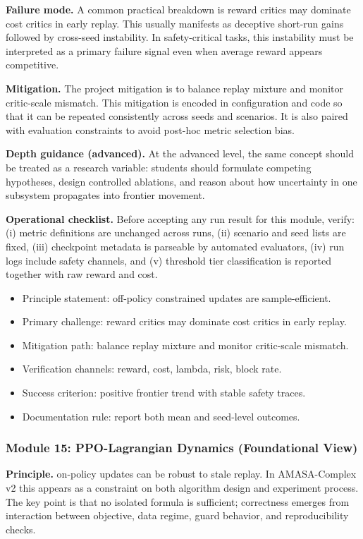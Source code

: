 \documentclass[conference]{IEEEtran}
\begin{document}
\textbf{Failure mode.} A common practical breakdown is reward critics may dominate cost critics in early replay. This usually manifests as deceptive short-run gains followed by cross-seed instability. In safety-critical tasks, this instability must be interpreted as a primary failure signal even when average reward appears competitive.

\textbf{Mitigation.} The project mitigation is to balance replay mixture and monitor critic-scale mismatch. This mitigation is encoded in configuration and code so that it can be repeated consistently across seeds and scenarios. It is also paired with evaluation constraints to avoid post-hoc metric selection bias.

\textbf{Depth guidance (advanced).} At the advanced level, the same concept should be treated as a research variable: students should formulate competing hypotheses, design controlled ablations, and reason about how uncertainty in one subsystem propagates into frontier movement.

\textbf{Operational checklist.} Before accepting any run result for this module, verify: (i) metric definitions are unchanged across runs, (ii) scenario and seed lists are fixed, (iii) checkpoint metadata is parseable by automated evaluators, (iv) run logs include safety channels, and (v) threshold tier classification is reported together with raw reward and cost.

\begin{itemize}[leftmargin=*]
  \item Principle statement: off-policy constrained updates are sample-efficient.
  \item Primary challenge: reward critics may dominate cost critics in early replay.
  \item Mitigation path: balance replay mixture and monitor critic-scale mismatch.
  \item Verification channels: reward, cost, lambda, risk, block rate.
  \item Success criterion: positive frontier trend with stable safety traces.
  \item Documentation rule: report both mean and seed-level outcomes.
\end{itemize}


\subsubsection{Module 15: PPO-Lagrangian Dynamics (Foundational View)}
\textbf{Principle.} on-policy updates can be robust to stale replay. In AMASA-Complex v2 this appears as a constraint on both algorithm design and experiment process. The key point is that no isolated formula is sufficient; correctness emerges from interaction between objective, data regime, guard behavior, and reproducibility checks.
\end{document}

